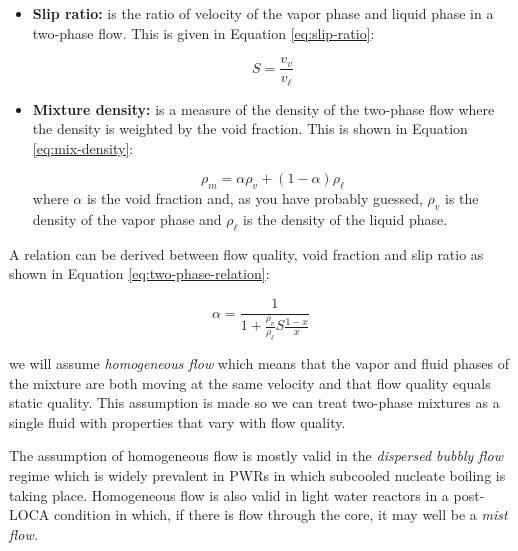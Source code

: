 \begin{itemize}
\item \textbf{Slip ratio:} is the ratio of velocity of the vapor phase and liquid phase in a two-phase flow.  This is given in Equation \ref{eq:slip-ratio}: 

\begin{equation}
S = \frac{v_{v}}{v_{\ell}}
\label{eq:slip-ratio}
\end{equation}

\item \textbf{Mixture density:} is a measure of the density of the two-phase flow where the density is weighted by the void fraction.  This is shown in Equation \ref{eq:mix-density}: 

\begin{equation}
\rho_m = \alpha \rho_v + (1-\alpha) \rho_{\ell}
\label{eq:mix-density}
\end{equation}
where $\alpha$ is the void fraction and, as you have probably guessed, $\rho_v$ is the density of the vapor phase and $\rho_{\ell}$ is the density of the liquid phase.

\end{itemize}

A relation can be derived between flow quality, void fraction and slip ratio as shown in Equation \ref{eq:two-phase-relation}:

\begin{equation}
\alpha = \frac{1}{1 + \frac{\rho_v}{\rho_{\ell}}S \frac{1 - x}{x}}
\label{eq:two-phase-relation}
\end{equation}

 we will assume \emph{homogeneous flow} which means that the vapor and fluid phases of the mixture are both moving at the same velocity and that flow quality equals static quality.  This assumption is made so we can treat two-phase mixtures as a single fluid with properties that vary with flow quality.

The assumption of homogeneous flow is mostly valid in the \emph{dispersed bubbly flow} regime which is widely prevalent in PWRs in which subcooled nucleate boiling is taking place.  Homogeneous flow is also valid in light water reactors in a post-LOCA condition in which, if there is flow through the core, it may well be a \emph{mist flow.}

